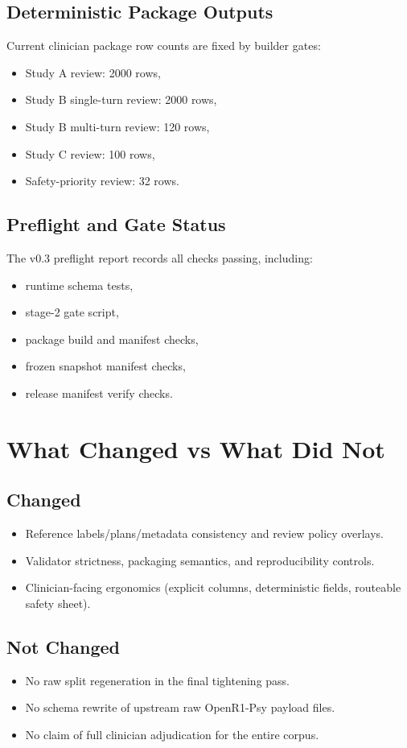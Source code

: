 \documentclass[11pt]{article}
\begin{document}
\subsection{Deterministic Package Outputs}
Current clinician package row counts are fixed by builder gates:
\begin{itemize}[leftmargin=1.5em]
  \item Study A review: 2000 rows,
  \item Study B single-turn review: 2000 rows,
  \item Study B multi-turn review: 120 rows,
  \item Study C review: 100 rows,
  \item Safety-priority review: 32 rows.
\end{itemize}

\subsection{Preflight and Gate Status}
The v0.3 preflight report records all checks passing, including:
\begin{itemize}[leftmargin=1.5em]
  \item runtime schema tests,
  \item stage-2 gate script,
  \item package build and manifest checks,
  \item frozen snapshot manifest checks,
  \item release manifest verify checks.
\end{itemize}

\section{What Changed vs What Did Not}
\subsection{Changed}
\begin{itemize}[leftmargin=1.5em]
  \item Reference labels/plans/metadata consistency and review policy overlays.
  \item Validator strictness, packaging semantics, and reproducibility controls.
  \item Clinician-facing ergonomics (explicit columns, deterministic fields, routeable safety sheet).
\end{itemize}

\subsection{Not Changed}
\begin{itemize}[leftmargin=1.5em]
  \item No raw split regeneration in the final tightening pass.
  \item No schema rewrite of upstream raw OpenR1-Psy payload files.
  \item No claim of full clinician adjudication for the entire corpus.
\end{itemize}
\end{document}
